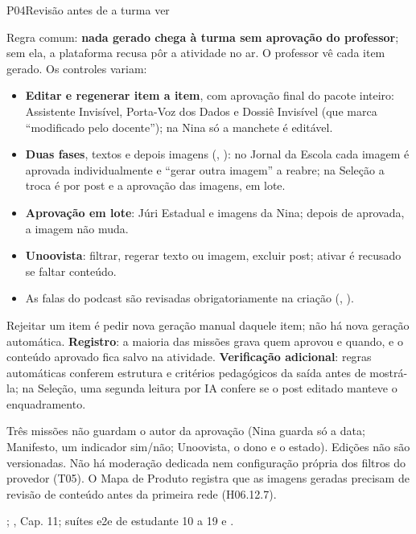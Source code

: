\begin{resposta}{P04}{Revisão antes de a turma ver}{\variapormissao}
\begin{campos}
  \item[Hoje] Regra comum: \textbf{nada gerado chega à turma sem aprovação do
    professor}; sem ela, a plataforma recusa pôr a atividade no ar. O
    professor vê cada item gerado. Os controles variam:
    \begin{itemize}
      \item \textbf{Editar e regenerar item a item}, com aprovação final do
        pacote inteiro: Assistente Invisível, Porta-Voz dos Dados e Dossiê
        Invisível (que marca ``modificado pelo docente''); na Nina só a
        manchete é editável.
      \item \textbf{Duas fases}, textos e depois imagens (,
        ): no Jornal da Escola cada imagem é aprovada
        individualmente e ``gerar outra imagem'' a reabre; na Seleção a troca é
        por post e a aprovação das imagens, em lote.
      \item \textbf{Aprovação em lote}: Júri Estadual e imagens da Nina; depois
        de aprovada, a imagem não muda.
      \item \textbf{Unoovista}: filtrar, regerar texto ou imagem, excluir post;
        ativar é recusado se faltar conteúdo.
      \item As falas do podcast são revisadas obrigatoriamente na criação
        (, ).
    \end{itemize}
    Rejeitar um item é pedir nova geração manual daquele item; não há nova
    geração automática. \textbf{Registro}: a maioria das missões grava quem
    aprovou e quando, e o conteúdo aprovado fica salvo na atividade.
    \textbf{Verificação adicional}: regras automáticas conferem estrutura e
    critérios pedagógicos da saída antes de mostrá-la; na Seleção, uma
    segunda leitura por IA confere se o post editado manteve o enquadramento.
  \item[Limitações] Três missões não guardam o autor da aprovação (Nina guarda
    só a data; Manifesto, um indicador sim/não; Unoovista, o dono e o
    estado). Edições não são versionadas. Não há moderação dedicada nem
    configuração própria dos filtros do provedor (T05). O Mapa de Produto
    registra que as imagens geradas precisam de revisão de conteúdo antes da
    primeira rede (H06.12.7).
  \item[Evidência] ;
    , Cap. 11; suítes e2e de estudante 10 a 19 e
    .
\end{campos}
\end{resposta}

